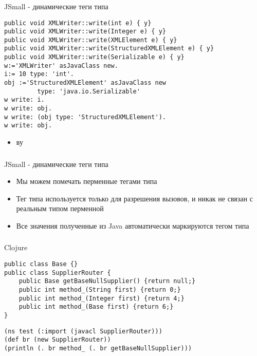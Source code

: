 \documentclass[t]{beamer}  %
\begin{document}
\begin{frame}[fragile]
	\frametitle{\insertsection} 
  	\framesubtitle{\insertsubsection}
    \begin{block}{JSmall - динамические теги типа}
    	    \begin{verbatim}
public void XMLWriter::write(int e) { y}
public void XMLWriter::write(Integer e) { y}
public void XMLWriter::write(XMLElement e) { y}
public void XMLWriter::write(StructuredXMLElement e) { y}
public void XMLWriter::write(Serializable e) { y}
w:='XMLWriter' asJavaClass new.
i:= 10 type: 'int'.
obj :='StructuredXMLElement' asJavaClass new
         type: 'java.io.Serializable'
w write: i.
w write: obj.
w write: (obj type: 'StructuredXMLElement').
w write: obj.
		\end{verbatim}
\begin{itemize}
\item ву
\end{itemize}
    \end{block}
\end{frame}

\begin{frame}[fragile]
	\frametitle{\insertsection} 
  	\framesubtitle{\insertsubsection}
    \begin{block}{JSmall - динамические теги типа}
\begin{itemize}
\item Мы можем помечать перменные тегами типа
\item Тег типа используется только для разрешения вызовов, и никак не связан с реальным типом перменной
\item Все значения полученные из Java автоматически маркируются тегом типа
\end{itemize}
    \end{block}
\end{frame}

\begin{frame}[fragile]
	\frametitle{\insertsection} 
  	\framesubtitle{\insertsubsection}
    \begin{block}{Clojure}
    	    \begin{verbatim}
public class Base {}
public class SupplierRouter {
    public Base getBaseNullSupplier() {return null;}
    public int method_(String first) {return 0;}
    public int method_(Integer first) {return 4;}
    public int method_(Base first) {return 6;}
}
		\end{verbatim}
	    \begin{verbatim}
(ns test (:import (javacl SupplierRouter)))
(def br (new SupplierRouter))
(println (. br method_ (. br getBaseNullSupplier)))
		\end{verbatim}
    \end{block}
\end{frame}
\end{document}
